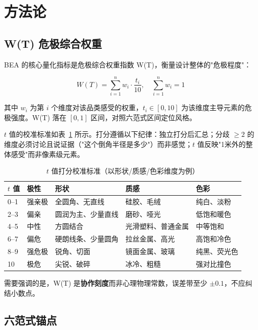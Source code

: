 \documentclass[10pt,a4paper]{article}
\begin{document}
\section{方法论}

\subsection{W(T) 危极综合权重}

BEA 的核心量化指标是危极综合权重指数 W(T)，衡量设计整体的"危极程度"：

\begin{equation}
W(T) = \sum_{i=1}^{n} w_i \cdot \frac{t_i}{10}, \quad \sum_{i=1}^{n} w_i = 1
\label{eq:wt}
\end{equation}

其中 $w_i$ 为第 $i$ 个维度对该品类感受的权重，$t_i \in [0,10]$ 为该维度主导元素的危极强度。W(T) 落在 $[0,1]$ 区间，对照六范式区间定位风格。

$t$ 值的校准标准如表~\ref{tab:tcalibration} 所示。打分遵循以下纪律：独立打分后汇总；分歧 $\geq 2$ 的维度必须讨论且说证据（"这个倒角半径是多少"）而非感觉；$t$ 值反映"1米外的整体感受"而非像素级元素。

\begin{table}[H]
\centering
\caption{$t$ 值打分校准标准（以形状/质感/色彩维度为例）}
\label{tab:tcalibration}
\begin{tabular}{p{1.2cm}p{1.5cm}p{3cm}p{3cm}p{3cm}}
\toprule
\textbf{$t$ 值} & \textbf{极性} & \textbf{形状} & \textbf{质感} & \textbf{色彩} \\
\midrule
0--1 & 强亲极 & 全圆角、无直线 & 硅胶、毛绒 & 纯白、淡粉 \\
2--3 & 偏亲 & 圆润为主、少量直线 & 磨砂、哑光 & 低饱和暖色 \\
4--5 & 中性 & 方圆结合 & 光滑塑料、普通金属 & 中等饱和 \\
6--7 & 偏危 & 硬朗线条、少量圆角 & 拉丝金属、高光 & 高饱和冷色 \\
8--9 & 强危极 & 锐角、切面 & 镜面金属、玻璃 & 纯黑、荧光色 \\
10 & 极危 & 尖锐、破碎 & 冰冷、粗糙 & 强对比撞色 \\
\bottomrule
\end{tabular}
\end{table}

需要强调的是，W(T) 是\textbf{协作刻度}而非心理物理常数，误差带至少 $\pm 0.1$，不应纠结小数点。

\subsection{六范式锚点}
\end{document}
